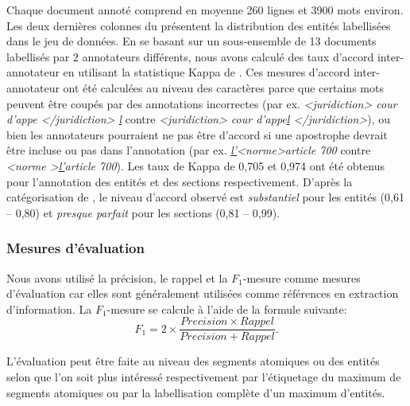 Chaque document annoté comprend en moyenne 260 lignes et 3900 mots environ. Les deux dernières colonnes du  présentent la distribution des entités labellisées dans le jeu de données. En se basant sur un sous-ensemble de 13 documents labellisés par 2 annotateurs différents, nous avons calculé des taux d'accord inter-annotateur en utilisant la statistique Kappa de \citet{cohen1960kappa}. Ces mesures d'accord inter-annotateur ont été calculées au niveau des caractères parce que certains mots peuvent être coupés par des annotations incorrectes (par ex. \textit{<juridiction> cour d'appe </juridiction> \underline{l}} contre \textit{<juridiction> cour d'appe\underline{l} </juridiction>}), ou bien les annotateurs pourraient ne pas être d'accord si une apostrophe devrait être incluse ou pas dans l'annotation (par ex. \textit{ \underline{l'}<norme>article 700} contre \textit{ <norme >\underline{l'}article 700}). Les taux de Kappa de 0,705 et 0,974 ont été obtenus pour l'annotation des entités et des sections respectivement. D'après la catégorisation de \citet{viera2005kappa}, le niveau d'accord observé est \textit{substantiel} pour les entités (0,61 -- 0,80) et \textit{presque parfait} pour les sections (0,81 -- 0,99).

\subsubsection{Mesures d'évaluation}
Nous avons utilisé la précision, le rappel et la $F_1$-mesure comme mesures d'évaluation car elles sont généralement utilisées comme références en extraction d'information. %
La $F_1$-mesure se calcule à l'aide de la formule suivante:  
\begin{equation}\label{eq:structuration:f1mesure}
F_1 = 2 \times \frac{Precision \times Rappel} {Precision + Rappel}.
\end{equation}

L'évaluation peut être faite au niveau des segments atomiques ou  des entités selon que l'on soit plus intéressé respectivement par l'étiquetage  du maximum de segments atomiques ou par la labellisation complète d'un maximum d'entités.

